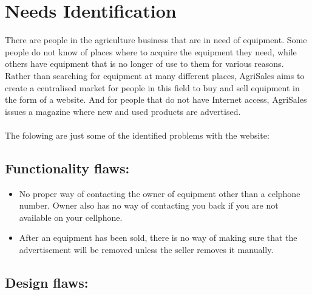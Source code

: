 \documentclass[11pt]{article}
\begin{document}


\tableofcontents

\newpage

\section{Needs Identification}

There are people in the agriculture business that are in need of equipment. Some people do not know of places where to acquire the equipment they need, while others have equipment that is no longer of use to them for various reasons. Rather than searching for equipment at many different places, AgriSales aims to create a centralised market for people in this field to buy and sell equipment in the form of a website. And for people that do not have Internet access, AgriSales issues a magazine where new and used products are advertised.
\\ \\
The folowing are just some of the identified problems with the website:

\subsection{Functionality flaws: }

\begin{itemize}
	\item No proper way of contacting the owner of equipment other than a celphone number. Owner also has no way of contacting you back if you are not available on your cellphone.
	\item After an equipment has been sold, there is no way of making sure that the advertisement will be removed unless the seller removes it manually.
\end{itemize}

\subsection{Design flaws: }
\end{document}
